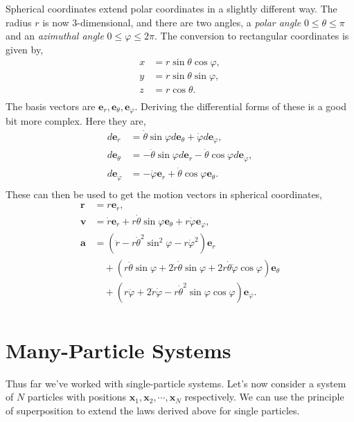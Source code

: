\documentclass[
  letterpaper,
  DIV=11,
  numbers=noendperiod]{scrreprt}
\begin{document}
Spherical coordinates extend polar coordinates in a slightly different
way. The radius \(r\) is now 3-dimensional, and there are two angles, a
\emph{polar angle} \(0 \leq \theta \leq \pi\) and an \emph{azimuthal
angle} \(0 \leq \varphi \leq 2\pi\). The conversion to rectangular
coordinates is given by, \[
\begin{align*} 
x &=  r\sin\theta\cos\varphi, \\ 
y &=  r\sin\theta\sin\varphi, \\
z &= r\cos\theta. \\ 
\end{align*}
\] The basis vectors are
\(\mathbf{e}_r, \mathbf{e}_\theta, \mathbf{e}_\varphi\). Deriving the
differential forms of these is a good bit more complex. Here they are,
\[
\begin{aligned}
d\mathbf{e}_r &= \dot\theta \sin\varphi d\mathbf{e}_\theta + \dot\varphi d\mathbf{e}_\varphi, \\
d\mathbf{e}_\theta &= - \dot\theta \sin\varphi d\mathbf{e}_r - \dot\theta \cos\varphi d\mathbf{e}_\varphi, \\
d\mathbf{e}_\varphi &= - \dot\varphi \mathbf{e}_r + \dot\theta \cos\varphi \mathbf{e}_\theta. \\
\end{aligned}
\] These can then be used to get the motion vectors in spherical
coordinates, \[
\begin{align*}
\mathbf{r} &= r \mathbf{e}_r, \\
\mathbf{v} &= \dot{r} \mathbf{e}_r + r \dot\theta \sin\varphi \mathbf{e}_{\theta} + r \dot\varphi \mathbf{e}_{\varphi}, \\
\mathbf{a} &= (\ddot{r} - r \dot{\theta}^2 \sin^2\varphi - r \dot{\varphi}^2) \mathbf{e}_r \\
&\quad + (r \ddot\theta \sin\varphi + 2 \dot{r} \dot\theta \sin\varphi + 2 r \dot\theta \dot\varphi \cos\varphi) \mathbf{e}_{\theta} \\
&\quad + (r \ddot\varphi + 2 \dot{r} \dot\varphi - r \dot{\theta}^2 \sin\varphi \cos\varphi) \mathbf{e}_{\varphi}. \\
\end{align*}
\]

\hypertarget{many-particle-systems}{%
\section{Many-Particle Systems}\label{many-particle-systems}}

Thus far we've worked with single-particle systems. Let's now consider a
system of \(N\) particles with positions
\(\mathbf{x}_1, \mathbf{x}_2, \cdots, \mathbf{x}_N\) respectively. We
can use the principle of superposition to extend the laws derived above
for single particles.
\end{document}
